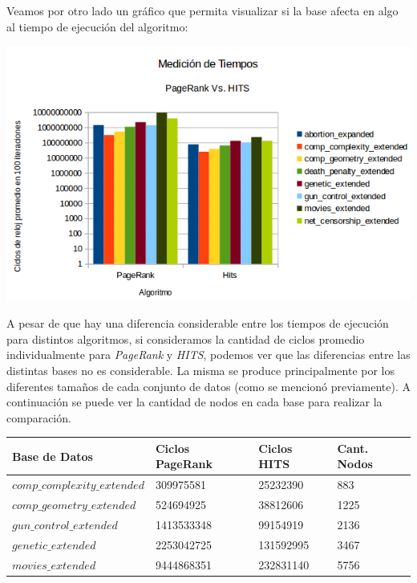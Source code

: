 Veamos por otro lado un gráfico que permita visualizar si la base afecta en algo al tiempo de ejecución del algoritmo:

	\par 
	\begin{center}
		\includegraphics[scale=0.6]{./img/medicionesTiempo2.png}
	\end{center}
	
	\par 

A pesar de que hay una diferencia considerable entre los tiempos de ejecución para distintos algoritmos, si consideramos la cantidad de ciclos promedio individualmente para \textit{PageRank} y \textit{HITS}, podemos ver que las diferencias entre las distintas bases no es considerable. La misma se produce principalmente por los diferentes tamaños de cada conjunto de datos (como se mencionó previamente). 
A continuación se puede ver la cantidad de nodos en cada base para realizar la comparación. 

\begin{center}
    \begin{tabular}{| l | l | l | l |}
    \hline
    Base de Datos & Ciclos PageRank & Ciclos HITS & Cant. Nodos \\ \hline
    $comp\_complexity\_extended$ & 309975581 & 25232390 & 883 \\ \hline
    $comp\_geometry\_extended$ & 524694925 & 38812606 & 1225 \\ \hline
	$gun\_control\_extended$ & 1413533348 & 99154919 & 2136 \\ \hline
	$genetic\_extended$ & 2253042725 & 131592995 & 3467 \\ \hline
	$movies\_extended$ & 9444868351 & 232831140	& 5756 \\ \hline
    \end{tabular}
\end{center}

